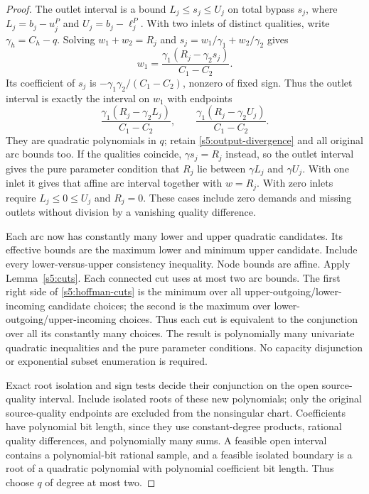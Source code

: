 \begin{proof}
The outlet interval is a bound $L_j\le s_j\le U_j$ on total bypass
$s_j$, where $L_j=b_j-u_j^P$ and $U_j=b_j-\ell_j^P$. With two inlets
of distinct qualities, write $\gamma_h=C_h-q$. Solving
$w_1+w_2=R_j$ and $s_j=w_1/\gamma_1+w_2/\gamma_2$ gives
\begin{equation}
 w_1=\frac{\gamma_1(R_j-\gamma_2s_j)}{C_1-C_2}.
 \label{s5:outlet-arc}
\end{equation}
Its coefficient of $s_j$ is
$-\gamma_1\gamma_2/(C_1-C_2)$, nonzero of fixed sign. Thus the outlet
interval is exactly the interval on $w_1$ with endpoints
\begin{equation}
 \frac{\gamma_1(R_j-\gamma_2L_j)}{C_1-C_2},\qquad
 \frac{\gamma_1(R_j-\gamma_2U_j)}{C_1-C_2}.
 \label{s5:quadratic-bounds}
\end{equation}
They are quadratic polynomials in $q$; retain
\eqref{s5:output-divergence} and all original arc bounds too.
If the qualities coincide, $\gamma s_j=R_j$ instead, so the outlet
interval gives the pure parameter condition that $R_j$ lie between
$\gamma L_j$ and $\gamma U_j$. With one inlet it gives that affine
arc interval together with $w=R_j$. With zero inlets require
$L_j\le0\le U_j$ and $R_j=0$. These cases include zero demands and
missing outlets without division by a vanishing quality difference.

Each arc now has constantly many lower and upper quadratic candidates.
Its effective bounds are the maximum lower and minimum upper candidate.
Include every lower-versus-upper consistency inequality. Node bounds
are affine. Apply Lemma~\ref{s5:cuts}. Each connected cut uses at most
two arc bounds. The first right side of \eqref{s5:hoffman-cuts} is the
minimum over all upper-outgoing/lower-incoming candidate choices; the
second is the maximum over lower-outgoing/upper-incoming choices.
Thus each cut is equivalent to the conjunction over all its constantly
many choices. The result is polynomially many univariate quadratic
inequalities and the pure parameter conditions. No capacity disjunction
or exponential subset enumeration is required.

Exact root isolation and sign tests decide their conjunction on the
open source-quality interval. Include isolated roots of these new
polynomials; only the original source-quality endpoints are excluded
from the nonsingular chart. Coefficients have polynomial bit length,
since they use constant-degree products, rational quality differences,
and polynomially many sums. A feasible open interval contains a
polynomial-bit rational sample, and a feasible isolated boundary is a
root of a quadratic polynomial with polynomial coefficient bit length. Thus choose $q$
of degree at most two.


\end{proof}
